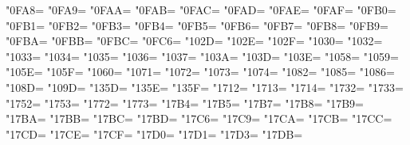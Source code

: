 \XeTeXcharclass"0FA8=\KclassNum
\XeTeXcharclass"0FA9=\KclassNum
\XeTeXcharclass"0FAA=\KclassNum
\XeTeXcharclass"0FAB=\KclassNum
\XeTeXcharclass"0FAC=\KclassNum
\XeTeXcharclass"0FAD=\KclassNum
\XeTeXcharclass"0FAE=\KclassNum
\XeTeXcharclass"0FAF=\KclassNum
\XeTeXcharclass"0FB0=\KclassNum
\XeTeXcharclass"0FB1=\KclassNum
\XeTeXcharclass"0FB2=\KclassNum
\XeTeXcharclass"0FB3=\KclassNum
\XeTeXcharclass"0FB4=\KclassNum
\XeTeXcharclass"0FB5=\KclassNum
\XeTeXcharclass"0FB6=\KclassNum
\XeTeXcharclass"0FB7=\KclassNum
\XeTeXcharclass"0FB8=\KclassNum
\XeTeXcharclass"0FB9=\KclassNum
\XeTeXcharclass"0FBA=\KclassNum
\XeTeXcharclass"0FBB=\KclassNum
\XeTeXcharclass"0FBC=\KclassNum
\XeTeXcharclass"0FC6=\KclassNum
\XeTeXcharclass"102D=\KclassNum
\XeTeXcharclass"102E=\KclassNum
\XeTeXcharclass"102F=\KclassNum
\XeTeXcharclass"1030=\KclassNum
\XeTeXcharclass"1032=\KclassNum
\XeTeXcharclass"1033=\KclassNum
\XeTeXcharclass"1034=\KclassNum
\XeTeXcharclass"1035=\KclassNum
\XeTeXcharclass"1036=\KclassNum
\XeTeXcharclass"1037=\KclassNum
\XeTeXcharclass"103A=\KclassNum
\XeTeXcharclass"103D=\KclassNum
\XeTeXcharclass"103E=\KclassNum
\XeTeXcharclass"1058=\KclassNum
\XeTeXcharclass"1059=\KclassNum
\XeTeXcharclass"105E=\KclassNum
\XeTeXcharclass"105F=\KclassNum
\XeTeXcharclass"1060=\KclassNum
\XeTeXcharclass"1071=\KclassNum
\XeTeXcharclass"1072=\KclassNum
\XeTeXcharclass"1073=\KclassNum
\XeTeXcharclass"1074=\KclassNum
\XeTeXcharclass"1082=\KclassNum
\XeTeXcharclass"1085=\KclassNum
\XeTeXcharclass"1086=\KclassNum
\XeTeXcharclass"108D=\KclassNum
\XeTeXcharclass"109D=\KclassNum
\XeTeXcharclass"135D=\KclassNum
\XeTeXcharclass"135E=\KclassNum
\XeTeXcharclass"135F=\KclassNum
\XeTeXcharclass"1712=\KclassNum
\XeTeXcharclass"1713=\KclassNum
\XeTeXcharclass"1714=\KclassNum
\XeTeXcharclass"1732=\KclassNum
\XeTeXcharclass"1733=\KclassNum
\XeTeXcharclass"1752=\KclassNum
\XeTeXcharclass"1753=\KclassNum
\XeTeXcharclass"1772=\KclassNum
\XeTeXcharclass"1773=\KclassNum
\XeTeXcharclass"17B4=\KclassNum
\XeTeXcharclass"17B5=\KclassNum
\XeTeXcharclass"17B7=\KclassNum
\XeTeXcharclass"17B8=\KclassNum
\XeTeXcharclass"17B9=\KclassNum
\XeTeXcharclass"17BA=\KclassNum
\XeTeXcharclass"17BB=\KclassNum
\XeTeXcharclass"17BC=\KclassNum
\XeTeXcharclass"17BD=\KclassNum
\XeTeXcharclass"17C6=\KclassNum
\XeTeXcharclass"17C9=\KclassNum
\XeTeXcharclass"17CA=\KclassNum
\XeTeXcharclass"17CB=\KclassNum
\XeTeXcharclass"17CC=\KclassNum
\XeTeXcharclass"17CD=\KclassNum
\XeTeXcharclass"17CE=\KclassNum
\XeTeXcharclass"17CF=\KclassNum
\XeTeXcharclass"17D0=\KclassNum
\XeTeXcharclass"17D1=\KclassNum
\XeTeXcharclass"17D3=\KclassNum
\XeTeXcharclass"17DB=\KclassNum
